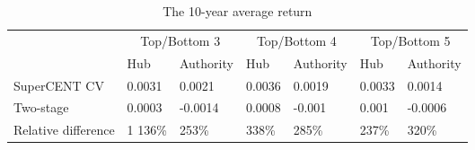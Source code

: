 \begin{table}

\caption{\label{tab:tbl:excess-return-5}The 10-year average return}
\centering
\begin{tabular}[t]{lllllll}
\toprule
\multicolumn{1}{c}{} & \multicolumn{2}{c}{Top/Bottom 3} & \multicolumn{2}{c}{Top/Bottom 4} & \multicolumn{2}{c}{Top/Bottom 5} \\
\cmidrule(l{3pt}r{3pt}){2-3} \cmidrule(l{3pt}r{3pt}){4-5} \cmidrule(l{3pt}r{3pt}){6-7}
 & Hub & Authority & Hub & Authority & Hub & Authority\\
\midrule
SuperCENT CV & 0.0031 & 0.0021 & 0.0036 & 0.0019 & 0.0033 & 0.0014\\
Two-stage & 0.0003 & -0.0014 & 0.0008 & -0.001 & 0.001 & -0.0006\\
Relative difference & 1 136\% & 253\% & 338\% & 285\% & 237\% & 320\%\\
\bottomrule
\end{tabular}
\end{table}
